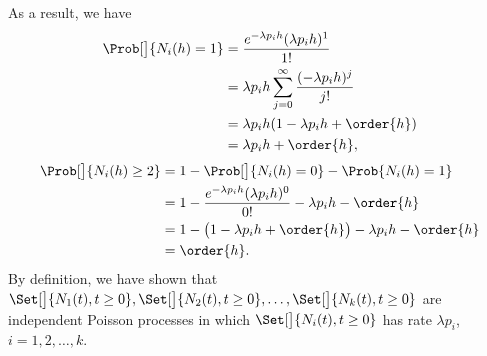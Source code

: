\begin{Regular}
    \vspace{2mm}

    As a result, we have
    \begin{align*}
        \Prob[\big]{N_i(h)=1}
         & =\frac{e^{-\lambda p_i h}(\lambda p_i h)^1}{1!}                 \\
         & =\lambda p_i h \sum_{j=0}^{\infty}\frac{(-\lambda p_i h)^j}{j!} \\
         & =\lambda p_i h(1-\lambda p_i h+\order{h})                       \\
         & =\lambda p_i h+\order{h},
    \end{align*}
    \begin{align*}
        \Prob[\big]{N_i(h)\ge 2}
         & =1-\Prob[\big]{N_i(h)=0}-\Prob{N_i(h)=1}                                  \\
         & =1-\frac{e^{-\lambda p_i h}(\lambda p_i h)^0}{0!}-\lambda p_i h-\order{h} \\
         & =1-\bigl(1-\lambda p_i h+\order{h}\bigr)-\lambda p_i h-\order{h}          \\
         & =\order{h}.
    \end{align*}
    By definition, we have shown that $ \Set[\big]{N_1(t),t\ge 0},\Set[\big]{N_2(t),t\ge 0},\ldots,\Set[\big]{N_k(t),t\ge 0} $
    are independent Poisson processes in which $ \Set[\big]{N_i(t),t\ge 0} $ has rate $ \lambda p_i $, $ i=1,2,\ldots,k $.
\end{Regular}
